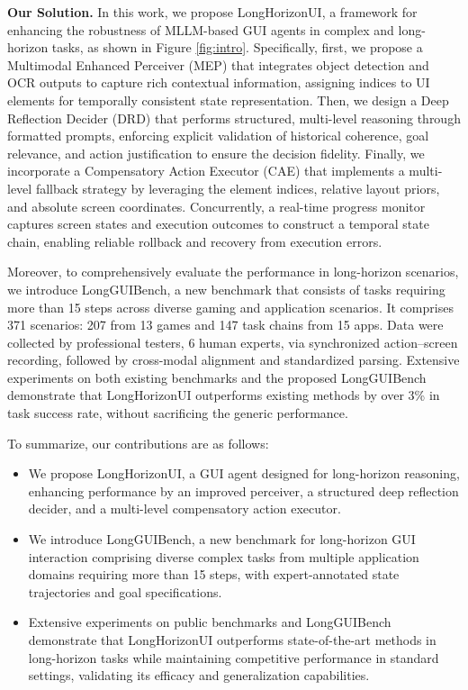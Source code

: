 \documentclass{article} %
\newcommand{\mypara}[1]{\vspace{0.4em}\noindent\textbf{#1}\hspace{0.2cm}}
\begin{document}
\mypara{Our Solution.}
In this work, we propose LongHorizonUI, a framework for enhancing the robustness of MLLM-based GUI agents in complex and long-horizon tasks, as shown in Figure \ref{fig:intro}. Specifically, first, we propose a Multimodal Enhanced Perceiver (MEP) that integrates object detection and OCR outputs to capture rich contextual information, assigning indices to UI elements for temporally consistent state representation. Then, we design a Deep Reflection Decider (DRD) that performs structured, multi-level reasoning through formatted prompts, enforcing explicit validation of historical coherence, goal relevance, and action justification to ensure the decision fidelity. Finally, we incorporate a Compensatory Action Executor (CAE) that implements a multi-level fallback strategy by leveraging the element indices, relative layout priors, and absolute screen coordinates. Concurrently, a real-time progress monitor captures screen states and execution outcomes to construct a temporal state chain, enabling reliable rollback and recovery from execution errors.

Moreover, to comprehensively evaluate the performance in long-horizon scenarios, we introduce LongGUIBench, a new benchmark that consists of tasks requiring more than 15 steps across diverse gaming and application scenarios. It comprises 371 scenarios: 207 from 13 games and 147 task chains from 15 apps. Data were collected by professional testers, 6 human experts, via synchronized action–screen recording, followed by cross-modal alignment and standardized parsing. Extensive experiments on both existing benchmarks and the proposed LongGUIBench demonstrate that LongHorizonUI outperforms existing methods by over 3\% in task success rate, without sacrificing the generic performance.




To summarize, our contributions are as follows:
\begin{itemize}[leftmargin=*,topsep=0pt]
    \item We propose LongHorizonUI, a GUI agent designed for long-horizon reasoning, enhancing performance by an improved perceiver, a structured deep reflection decider, and a multi-level compensatory action executor.
    \item We introduce LongGUIBench, a new benchmark for long-horizon GUI interaction comprising diverse complex tasks from multiple application domains requiring more than 15 steps, with expert-annotated state trajectories and goal specifications.
    \item Extensive experiments on public benchmarks and LongGUIBench demonstrate that LongHorizonUI outperforms state-of-the-art methods in long-horizon tasks while maintaining competitive performance in standard settings, validating its efficacy and generalization capabilities.
\end{itemize}
\end{document}
